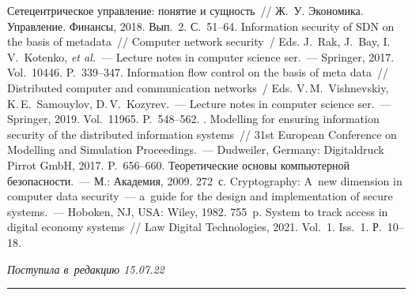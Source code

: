 \begin{multicols}{2}
{\small\frenchspacing
 {%
 \begin{thebibliography}{9}
 Сетецентрическое управление: понятие 
и сущность~// Ж.~У. Экономика. Управление. Финансы, 2018. Вып.~2. С.~51--64. 
 Information security of 
SDN on the basis of metadata~// Computer network security~/ Eds. J.~Rak, J.~Bay, I.\,V.~Kotenko, 
\textit{et al.}~--- Lecture notes in computer science ser.~--- Springer, 2017. Vol.~10446. P.~339--347.
 Information flow control on the basis of meta data~// 
Distributed computer and communication networks~/ Eds. V.\,M.~Vishnevskiy, K.\,E.~Samouylov, D.\,V.~Kozyrev.~--- Lecture notes in computer 
science ser.~--- Springer, 2019. Vol.~11965. P.~548--562. 
. Modelling for ensuring information security of 
the distributed information systems~// 31st European Conference on Modelling and Simulation 
Proceedings.~--- Dudweiler, Germany: Digitaldruck Pirrot GmbH, 2017. P.~656--660.
 Теоретические основы компьютерной 
безопасности.~--- М.: Академия, 2009. 272~с.
 Cryptography: A~new dimension in computer data security~--- 
a~guide for the design and implementation of secure systems.~--- Hoboken, NJ, USA: Wiley, 1982. 
755~p.
 System to track access in digital economy systems~// 
Law Digital Technologies, 2021. Vol.~1. Iss.~1. Р.~10--18.

  \end{thebibliography}

 }
 }

\end{multicols}

\vspace*{-6pt}

\hfill{\small\textit{Поступила в~редакцию 15.07.22}}

\vspace*{8pt}




\hrule

